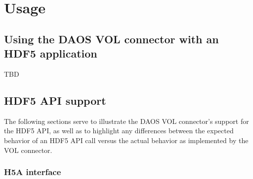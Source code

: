 \documentclass[12pt]{article}
\begin{document}
\section{Usage}

\subsection{Using the DAOS VOL connector with an HDF5 application}

TBD

\subsection{HDF5 API support}

The following sections serve to illustrate the DAOS VOL connector's support for the HDF5 API, as well as to highlight any differences between the expected behavior of an HDF5 API call versus the actual behavior as implemented by the VOL connector.

\subsubsection{H5A interface}
\end{document}
